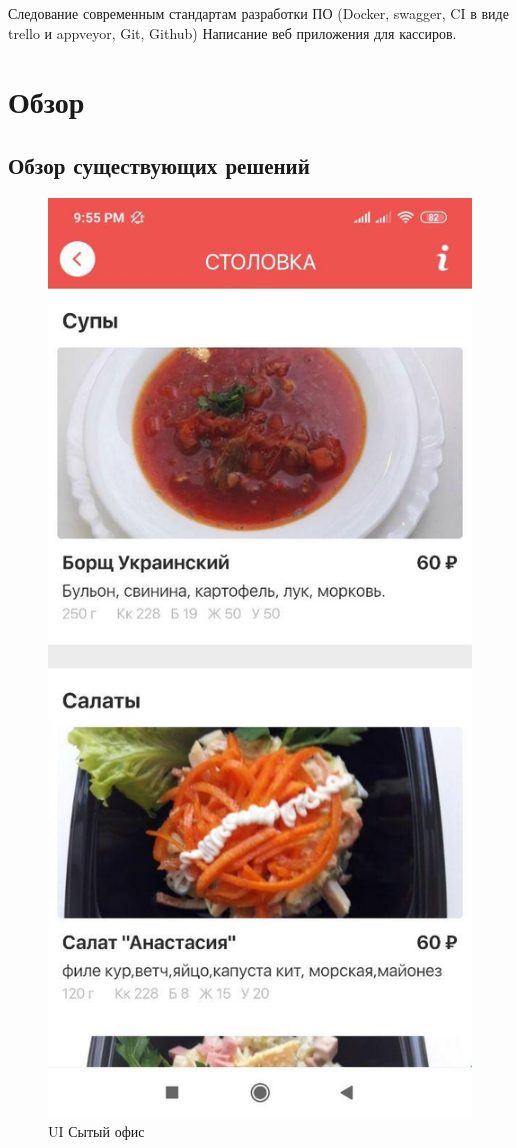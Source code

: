 \documentclass[14pt]{matmex-diploma-custom}
\begin{document}
    Следование современным стандартам разработки ПО (Docker, swagger, CI в виде trello и appveyor, Git, Github)
    Написание веб приложения для кассиров.

\section{Обзор}
\subsection{Обзор существующих решений}

    \begin{figure}
    \centering
    \includegraphics[scale=0.40]{fig1.jpg}
    \caption{UI Сытый офис}
    \end{figure}
\end{document}
